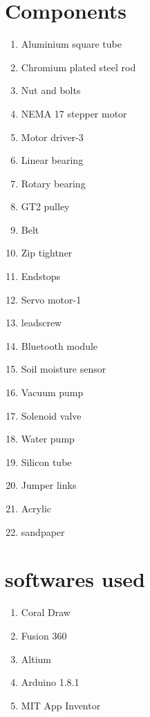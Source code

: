 \documentclass[12pt,a4paper]{report}
\begin{document}
\section{Components}
\begin{enumerate}
 
\item 	Aluminium square tube
\item 	Chromium plated steel rod
\item	Nut and bolts
\item 	NEMA 17 stepper motor
\item   Motor driver-3
\item 	Linear bearing
\item 	Rotary bearing
\item 	GT2 pulley
\item 	Belt
\item 	Zip tightner
\item 	Endstops
\item 	Servo motor-1
\item 	leadscrew
\item 	Bluetooth module
\item 	Soil moisture sensor
\item 	Vacuum pump
\item 	Solenoid valve
\item 	Water pump
\item 	Silicon tube
\item 	Jumper links
\item 	Acrylic
\item 	sandpaper


 \end{enumerate}
\section{softwares used}
\begin{enumerate}
\item 	Coral Draw
\item   Fusion 360
\item	Altium 
\item   Arduino 1.8.1
\item	MIT App Inventor

 \end{enumerate}
\end{document}
